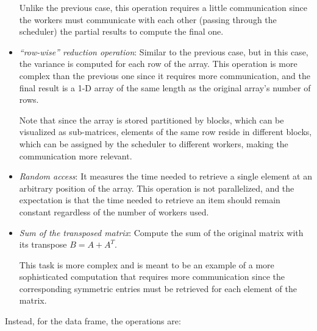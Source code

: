 \begin{itemize}
    Unlike the previous case, this operation requires a little communication
    since the workers must communicate with each other (passing through the
    scheduler) the partial results to compute the final one.
 \item \textit{``row-wise'' reduction operation}: Similar to the previous case,
   but in this case, the variance is computed for each row of the array.
    This operation is more complex than the previous one since it requires more
    communication, and the final result is a 1-D array of the same length as the
    original array's number of rows.

    Note that since the array is stored partitioned by blocks, which can be
    visualized as sub-matrices, elements of the same row reside in different
    blocks, which can be assigned by the scheduler to different workers, making
    the communication more relevant.
  \item \textit{Random access}: It measures the time needed to retrieve a single
    element at an arbitrary position of the array. This operation is not
    parallelized, and the expectation is that the time needed to retrieve an
    item should remain constant regardless of the number of workers used.
  \item \textit{Sum of the transposed matrix}: Compute the sum of the original
    matrix with its transpose $B = A+A^T$.

    This task is more complex and is meant to be an example of a more
    sophisticated computation that requires more communication since the
    corresponding symmetric entries must be retrieved for each element of the
    matrix.
\end{itemize}

Instead, for the data frame, the operations are:

